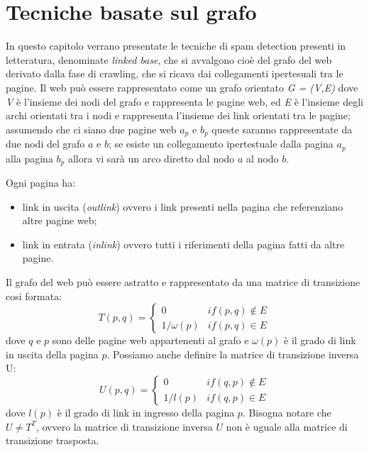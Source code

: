 \chapter{Tecniche basate sul grafo}
In questo capitolo verrano presentate le tecniche di spam detection presenti in letteratura, denominate \textit{linked base}, che si avvalgono cioè del grafo del web  derivato dalla fase di crawling, che si ricava dai collegamenti ipertesuali tra le pagine. Il web può essere rappresentato come un grafo orientato \textit{G = (V,E)} dove \textit{V} è l'insieme dei nodi del grafo e rappresenta le pagine web, ed \textit{E} è l'insieme degli archi  orientati tra i nodi e rappresenta l'insieme dei link orientati tra le pagine; assumendo che ci siano due pagine web \(a_p\) e \(b_p\) queste saranno rappresentate da due nodi del grafo \(a\) e \(b\); se esiste un collegamento ipertestuale  dalla pagina \(a_p\) alla pagina \(b_p\) allora vi sarà un arco diretto dal nodo \(a\) al nodo \(b\). 

Ogni pagina ha:
\begin{itemize}
 \item  link in uscita (\textit{outlink}) ovvero i link presenti nella pagina che referenziano altre pagine web;
 \item  link in entrata (\textit{inlink}) ovvero tutti i riferimenti della pagina fatti da altre pagine.
\end{itemize}

Il grafo del web può essere astratto e rappresentato da una matrice di transizione cosi formata:
\begin{equation}
T(p,q)=\left \{
\begin{array}{cc}
0 & if(p,q) \not\in E\\
1/\omega(p) & if(p,q) \in E
\end{array}
\right .
\end{equation}
dove \(q\) e \(p\) sono delle pagine web appartenenti al grafo e \(\omega(p)\) è il grado di link in uscita della pagina \(p\). 
Possiamo anche definire la matrice di transizione inversa U:
\begin{equation}
U(p,q)=\left \{
\begin{array}{cc}
0 & if(q,p) \not\in E\\
1/l(p) & if(q,p) \in E
\end{array}
\right .
\end{equation}
dove \(l(p)\) è il grado di link in ingresso della pagina \(p\). Bisogna notare che \(U \not = T^T\), ovvero la matrice di transizione inversa \(U\) non è uguale alla matrice di transizione trasposta.
